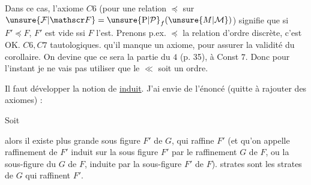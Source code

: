 Dans ce cas, l'axiome $C6$ (pour une relation   $\preceq$ sur $\unsure{\mathcal F|\mathscr F}=\unsure{\mathrm P|\mathcal P}_{f}(\unsure{M|\mathcal M})$) signifie  que si $F'\preceq F$, $F'$ est vide ssi $F$ l'est. Prenons p.ex.  $\preceq$   la relation d'ordre discrète, c'est OK.  $C6,C7$ tautologiques.  qu'il manque un axiome, pour assurer la validité du corollaire. On devine que ce sera la partie  du  $4$ (p. 35),  à Const $7$. Donc pour l'instant je ne vais pas utiliser que le  $\ll$ soit un ordre.




Il faut développer la notion de \uline{ induit}. J'ai envie de   l'énoncé (quitte à rajouter des axiomes) :

  Soit


alors il existe  plus grande sous figure $F'$ de $G$, qui raffine $F'$ (et qu'on appelle raffinement de $F'$ induit  sur la sous figure $F'$ par le raffinement $G$ de $F$, ou la sous-figure du   $G$ de $F$, induite par la sous-figure $F'$ de $F$).   strates  sont les strates de $G$ qui raffinent $F'$. 

